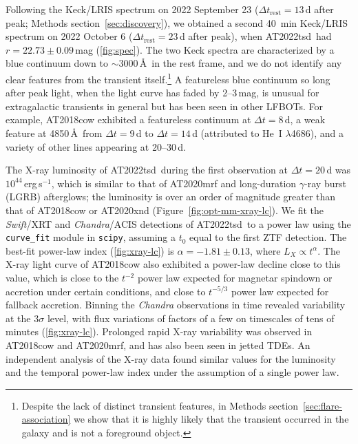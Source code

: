 \documentclass{nature_plusfigure}
\newcommand{\at}{AT2022tsd}
\begin{document}
\begin{methods}
Following the Keck/LRIS spectrum on 2022 September 23 ($\Delta t_\mathrm{rest}=13\,$d after peak; Methods section~\ref{sec:discovery}), we obtained a second 40~min Keck/LRIS spectrum on 2022 October 6 ($\Delta t_\mathrm{rest}=23$\,d after peak), when \at\ had $r=22.73\pm0.09\,$mag (\ref{fig:spec}). 
The two Keck spectra are characterized by a blue continuum down to $\sim3000\,$\AA\ in the rest frame, and we do not identify any clear features from the transient itself.\footnote{Despite the lack of distinct transient features, in Methods section~\ref{sec:flare-association} we show that it is highly likely that the transient occurred in the galaxy and is not a foreground object.} A featureless blue continuum so long after peak light, when the light curve has faded by 2--3\,mag, is unusual for extragalactic transients in general\cite{GalYam2017hsn} but has been seen in other LFBOTs.
For example, AT2018cow\cite{Perley2019} exhibited a featureless continuum at $\Delta t=8$\,d, a weak feature at 4850\,\AA\ from $\Delta t=9$\,d to $\Delta t=14$\,d (attributed to He~I $\lambda$4686), and a variety of other lines appearing at 20--30\,d.

The X-ray luminosity of \at\ during the first observation at $\Delta t=20$\,d was $10^{44}\,$erg\,s$^{-1}$, which is similar to that of AT2020mrf\cite{Yao2022} and long-duration $\gamma$-ray burst (LGRB) afterglows; the luminosity is over an order of magnitude greater than that of AT2018cow\cite{RiveraSandoval2018,Margutti2019,Ho2019} or AT2020xnd\cite{Ho2022_AT2020xnd,Bright2022} (Figure~\ref{fig:opt-mm-xray-lc}).
We fit the {\it Swift}/XRT and {\it Chandra}/ACIS detections of \at\ to a power law using the \texttt{curve\_fit} module in \texttt{scipy}, assuming a $t_0$ equal to the first ZTF detection. The best-fit power-law index (\ref{fig:xray-lc}) is $\alpha=-1.81\pm0.13$, where $L_X \propto t^{\alpha}$.
The X-ray light curve of AT2018cow also exhibited a power-law decline close to this value\cite{Margutti2019,Ho2019},
which is close to the $t^{-2}$ power law expected for magnetar spindown or accretion under certain conditions\cite{Metzger2022},
and close to $t^{-5/3}$ power law expected for fallback accretion\cite{Phinney1989}.
Binning the {\it Chandra} observations in time revealed variability at the 3$\sigma$ level, with flux variations of factors of a few on timescales of tens of minutes (\ref{fig:xray-lc}). Prolonged rapid X-ray variability was observed in AT2018cow\cite{RiveraSandoval2018,Margutti2019,Ho2019} and AT2020mrf\cite{Yao2022}, and has also been seen in jetted TDEs\cite{Levan2011,Burrows2011,Cenko2012}. An independent analysis of the X-ray data\cite{Matthews2023} found similar values for the luminosity and the temporal power-law index under the assumption of a single power law. %


\end{methods}
\end{document}
